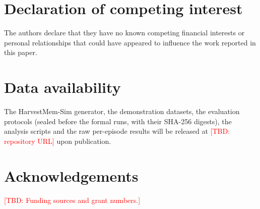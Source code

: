 \documentclass[preprint,review,12pt,authoryear]{elsarticle}
\newcommand{\tbd}[1]{\textcolor{red}{[TBD: #1]}}
\begin{document}
\section*{Declaration of competing interest}
The authors declare that they have no known competing financial interests or personal relationships that could have appeared to influence the work reported in this paper.

\section*{Data availability}
The HarvestMem-Sim generator, the demonstration datasets, the evaluation protocols (sealed before the formal runs, with their SHA-256 digests), the analysis scripts and the raw per-episode results will be released at \tbd{repository URL} upon publication.

\section*{Acknowledgements}
\tbd{Funding sources and grant numbers.}



\end{document}
